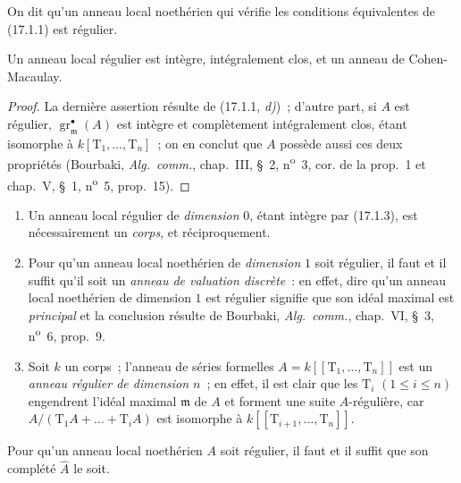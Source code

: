 \begin{definition}[17.1.2]
\label{0.17.1.2-fr}
On dit qu'un anneau local noethérien qui vérifie les conditions équivalentes de
\textup{(17.1.1)} est régulier.
\end{definition}

\begin{corollary}[17.1.3]
\label{0.17.1.3-fr}
Un anneau local régulier est intègre, intégralement clos, et un anneau de
Cohen-Macaulay.
\end{corollary}

\begin{proof}
La dernière assertion résulte de (17.1.1, \emph{d)})~; d'autre part, si $A$ est
régulier, $\operatorname{gr}^\bullet_{\mathfrak{m}}(A)$ est intègre et complètement
intégralement clos, étant isomorphe à $k[\mathrm{T}_1,\ldots,\mathrm{T}_n]$~;
on en conclut que $A$ possède aussi ces deux propriétés (Bourbaki,
\emph{Alg.~comm.}, chap.~III, \S~2, n\textsuperscript{o}~3, cor. de la prop.~1 et chap.~V,
\S~1, n\textsuperscript{o}~5, prop.~15).
\end{proof}

\begin{examples}[17.1.4]
\label{0.17.1.4-fr}
\begin{enumerate}
  \item[\rm (i)] Un anneau local régulier de \emph{dimension} $0$, étant
  intègre par (17.1.3), est nécessairement un \emph{corps}, et réciproquement.
  \item[\rm (ii)] Pour qu'un anneau local noethérien de \emph{dimension} $1$
  soit régulier, il faut et il suffit qu'il soit un \emph{anneau de valuation
  discrète}~: en effet, dire qu'un anneau local noethérien de dimension $1$ est
  régulier signifie que son idéal maximal est \emph{principal} et la conclusion
  résulte de Bourbaki, \emph{Alg.~comm.}, chap.~VI, \S~3, n\textsuperscript{o}~6, prop.~9.
  \item[\rm (iii)] Soit $k$ un corps~; l'anneau de séries formelles
  $A=k[[\mathrm{T}_1,\ldots,\mathrm{T}_n]]$ est un \emph{anneau régulier de
  dimension $n$}~; en effet, il est clair que les $\mathrm{T}_i$
  $(1\leq i\leq n)$ engendrent l'idéal maximal $\mathfrak{m}$ de $A$ et
  forment une suite $A$-régulière, car
  $A/(\mathrm{T}_1A+\ldots+\mathrm{T}_iA)$ est isomorphe à
  $k[[\mathrm{T}_{i+1},\ldots,\mathrm{T}_n]]$.
\end{enumerate}
\end{examples}

\begin{proposition}[17.1.5]
\label{0.17.1.5-fr}
Pour qu'un anneau local noethérien $A$ soit régulier, il faut et il suffit que
son complété $\widehat{A}$ le soit.
\end{proposition}

